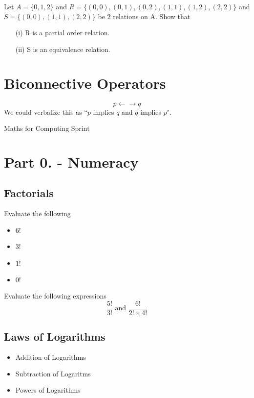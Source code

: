 \documentclass[]{report}
\begin{document}
Let $A=\{0,1,2\}$ and $R=\{ (0,0),(0,1),(0,2),(1,1), (1,2), (2,2)\}$
and $S=\{(0,0),(1,1),(2,2)\}$ be 2 relations on A. Show that

\begin{itemize}
\item[(i)] R is a partial order relation.
\item[(ii)] S is an equivalence relation.
\end{itemize}




\section*{Biconnective Operators}

\[ p \leftarrow \rightarrow q\]
We could verbalize this as ``$p$ implies $q$ and $q$ implies $p$".




Maths for Computing Sprint

\section*{Part 0. - Numeracy}
\subsection{Factorials}
Evaluate the following
\begin{itemize}
\item $6!$
\item $3!$
\item $1!$
\item $0!$
\end{itemize}
Evaluate the following expressions
\[  \frac{5!}{3!}  \mbox{   and   } \frac{6!}{2!\times 4!}  \]
\subsection*{Laws of Logarithms}
\begin{itemize}
\item Addition of Logarithms
\item Subtraction of Logaritms
\item Powers of Logarithms
\end{itemize}
\end{document}
